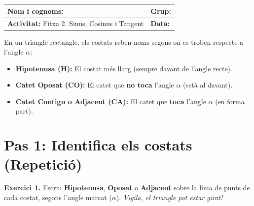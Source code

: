 \documentclass[12pt,a4paper]{article}
\begin{document}
\begingroup
\renewcommand{\arraystretch}{1.8}
\begin{tabularx}{\textwidth}{|X|p{4cm}|}
    \hline
    \textbf{Nom i cognoms:} & \textbf{Grup:} \\ \hline
    \textbf{Activitat:} Fitxa 2. Sinus, Cosinus i Tangent & \textbf{Data:} \\ \hline
\end{tabularx}
\endgroup

\vspace{0.4cm}

\begin{tcolorbox}[colback=blue!5,colframe=blue!75,title=Recorda: Els noms dels costats]
En un triangle rectangle, els costats reben noms segons on es troben respecte a l'angle $\alpha$:
\begin{itemize}
    \item \textbf{Hipotenusa (H):} El costat més llarg (sempre davant de l'angle recte).
    \item \textbf{Catet Oposat (CO):} El catet que \textbf{no toca} l'angle $\alpha$ (està al davant).
    \item \textbf{Catet Contigu o Adjacent (CA):} El catet que \textbf{toca} l'angle $\alpha$ (en forma part).
\end{itemize}
\end{tcolorbox}

\section*{Pas 1: Identifica els costats (Repetició)}
\textbf{Exercici 1.} Escriu \textbf{Hipotenusa}, \textbf{Oposat} o \textbf{Adjacent} sobre la línia de punts de cada costat, segons l'angle marcat ($\alpha$). \textit{Vigila, el triangle pot estar girat!}
\end{document}

